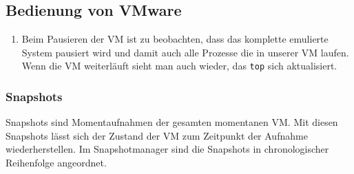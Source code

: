 \documentclass{scrartcl}
\begin{document}
    \subsection{Bedienung von VMware}
    \label{sub:Bedienung von VMware}

    \begin{enumerate}[3.]
      \item Beim Pausieren der VM ist zu beobachten, dass das komplette emulierte
            System pausiert wird und damit auch alle Prozesse die in unserer VM
            laufen. Wenn die VM weiterläuft sieht man auch wieder, das \texttt{top}
            sich aktualisiert.
    \end{enumerate}

    \subsubsection{Snapshots}
    \label{subs:Snapshots}

    Snapshots sind Momentaufnahmen der gesamten momentanen VM. Mit diesen Snapshots
    lässt sich der Zustand der VM zum Zeitpunkt der Aufnahme wiederherstellen.
    Im Snapshotmanager sind die Snapshots in chronologischer Reihenfolge angeordnet.
\end{document}
